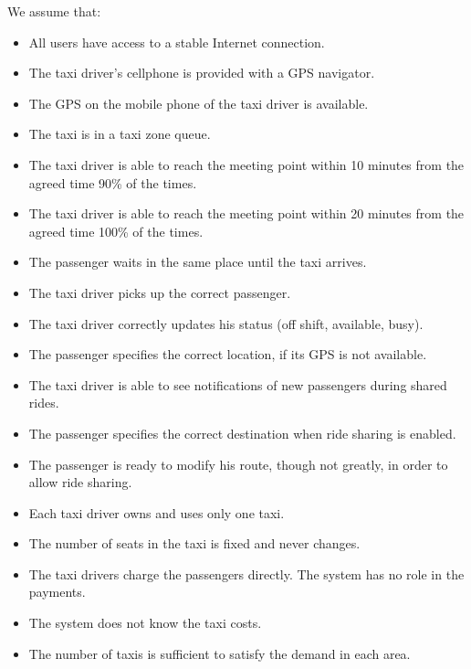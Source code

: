 We assume that:
\begin{itemize}
    \item All users have access to a stable Internet connection.
    \item The taxi driver's cellphone is provided with a GPS navigator.
    \item The GPS on the mobile phone of the taxi driver is available.
    \item The taxi is in a taxi zone queue.
    \item The taxi driver is able to reach the meeting point within 10 minutes from the agreed time 90\% of the times.
    \item The taxi driver is able to reach the meeting point within 20 minutes from the agreed time 100\% of the times.
    \item The passenger waits in the same place until the taxi arrives.
    \item The taxi driver picks up the correct passenger.
    \item The taxi driver correctly updates his status (off shift, available, busy).
    \item The passenger specifies the correct location, if its GPS is not available.
    \item The taxi driver is able to see notifications of new passengers during shared rides.
    \item The passenger specifies the correct destination when ride sharing is enabled.
    \item The passenger is ready to modify his route, though not greatly, in order to allow ride sharing.
    \item Each taxi driver owns and uses only one taxi.
    \item The number of seats in the taxi is fixed and never changes.
    \item The taxi drivers charge the passengers directly. The system has no role in the payments.
    \item The system does not know the taxi costs.
    \item The number of taxis is sufficient to satisfy the demand in each area.
\end{itemize}
